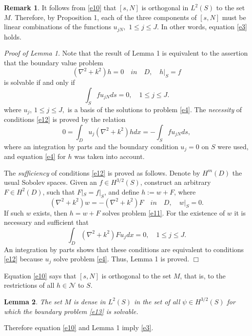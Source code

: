 \documentclass[12pt,leqno]{article}
\begin{document}
{\bf Remark 1}. It follows from \eqref{e10} that $[s,N]$ is orthogonal
in $L^2(S)$ to the set $M$. Therefore, by Proposition 1,  each of
the three components of $[s,N]$ must be  linear combinations of the
functions $u_{jN},\,\,1\le j\le J$. In other words, equation
\eqref{e3} holds.

{\it Proof of Lemma 1.} Note that the  result of Lemma 1 is
equivalent to the assertion that the boundary value problem
\begin{equation}
\label{e11}
(\nabla^2+k^2)h=0\quad in \quad D, \quad h|_S=f
\end{equation}
is solvable if and only if
\begin{equation}
\label{e12}
 \int_Sfu_{jN}ds=0, \quad 1\le j\le J.
\end{equation}
where $u_j$, $1\le j\le J,$ is a basis of the solutions to problem
\eqref{e4}.
The {\it necessity}  of conditions \eqref{e12} is proved by the relation
$$0=\int_Du_j(\nabla^2+k^2)hdx=-\int_Sfu_{jN}ds,$$
where an integration by parts  and the boundary condition $u_j=0$ on
$S$ were used, and equation \eqref{e4} for $h$
was taken into account.

The {\it sufficiency} of conditions \eqref{e12} is proved as follows.
Denote by $H^{m}(D)$ the usual Sobolev spaces. Given
an $f\in H^{3/2}(S)$, construct
an arbitrary $F\in H^2(D)$, such that $F|_S=f|_S$, and define
$h:=w+F$, where
\begin{equation}
\label{e13}
(\nabla^2+k^2)w=-(\nabla^2+k^2)F \quad in \quad D, \quad w|_S=0.
\end{equation}
If such $w$ exists, then $h=w+F$ solves problem \eqref{e11}.
For the existence of $w$ it is necessary and sufficient that
$$\int_D(\nabla^2+k^2)Fu_jdx=0,\quad 1\le j\le J.$$
An integration by parts shows that
these conditions are equivalent to conditions \eqref{e12} because
$u_j$ solve problem \eqref{e4}. Thus, Lemma 1 is
proved. \hfill $\Box$

Equation \eqref{e10} says that $[s,N]$ is orthogonal to the
set $M$, that is, to the restrictions of all $h\in \mathcal{N}$ to $S$.

{\bf Lemma  2}. {\it The set $M$ is dense in $L^2(S)$ in the set
of
all $\psi\in H^{3/2}(S)$ for which the boundary problem \eqref{e13} is
solvable.}

Therefore equation \eqref{e10} and
Lemma 1 imply  \eqref{e3}.
\end{document}
